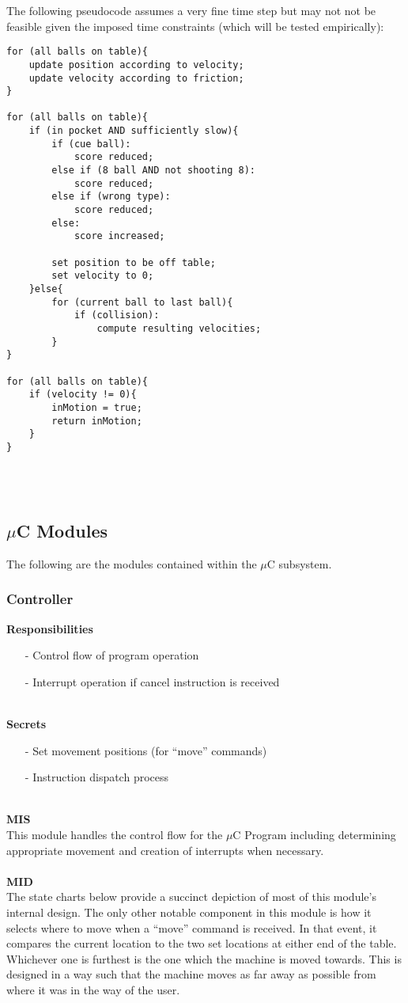 \documentclass[titlepage]{article}
\begin{document}
The following pseudocode assumes a very fine time step but may not not be feasible given the imposed time constraints (which will be tested empirically):
\begin{lstlisting}
for (all balls on table){
	update position according to velocity;
	update velocity according to friction;
}

for (all balls on table){
	if (in pocket AND sufficiently slow){
		if (cue ball):
			score reduced;
		else if (8 ball AND not shooting 8):
			score reduced;
		else if (wrong type):
			score reduced;
		else:
			score increased;
			
		set position to be off table;
		set velocity to 0;
	}else{
		for (current ball to last ball){
			if (collision):
				compute resulting velocities;
		}
}

for (all balls on table){
	if (velocity != 0){
		inMotion = true;
		return inMotion;
	}
}
\end{lstlisting}~\\\\
\subsection{$\mu$C Modules}
The following are the modules contained within the $\mu$C subsystem.
\subsubsection{Controller}
\textbf{Responsibilities}
\begin{itemize}
	\item[-] Control flow of program operation
	\item[-] Interrupt operation if cancel instruction is received
\end{itemize}~\\
\textbf{Secrets}
\begin{itemize}
	\item[-] Set movement positions (for ``move'' commands)
	\item[-] Instruction dispatch process
\end{itemize}~\\
\textbf{MIS}\\[2mm]
This module handles the control flow for the $\mu$C Program including determining appropriate movement and creation of interrupts when necessary. 
\\\\
\textbf{MID}\\[2mm]
The state charts below provide a succinct depiction of most of this module's internal design. The only other notable component in this module is how it selects where to move when a ``move'' command is received. In that event, it compares the current location to the two set locations at either end of the table. Whichever one is furthest is the one which the machine is moved towards. This is designed in a way such that the machine moves as far away as possible from where it was in the way of the user.
\\\\
\end{document}
